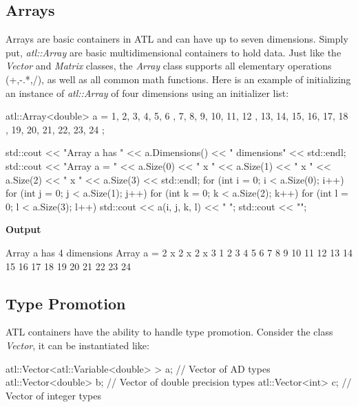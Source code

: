 \documentclass[12pt,a4paper]{article}
\begin{document}
\subsection{Arrays}
Arrays are basic containers in ATL and can have up to seven dimensions.   Simply put, \textit{atl::Array} are basic multidimensional containers to hold data. Just like the \textit{Vector} and \textit{Matrix} classes, the \textit{Array} class supports all elementary operations (+,-.*,/), as well as all common math functions. Here is an example of initializing an instance of \textit{atl::Array} of four dimensions using an initializer list:
\begin{cppsource}

  atl::Array<double> a = {
        {
            {
                {1, 2, 3},
                {4, 5, 6}
            },
            {
                {7, 8, 9},
                {10, 11, 12}
            }
        },
        {
            {
                {13, 14, 15},
                {16, 17, 18}
            },
            {
                {19, 20, 21},
                {22, 23, 24}
            }
        }
    };

    std::cout << "Array a has " << a.Dimensions() << " dimensions" << std::endl;
    std::cout << "Array a = " << a.Size(0) << " x " << a.Size(1) 
                  << " x " << a.Size(2) << " x " << a.Size(3) << std::endl;
    for (int i = 0; i < a.Size(0); i++) {
        for (int j = 0; j < a.Size(1); j++) {
            for (int k = 0; k < a.Size(2); k++) {
                for (int l = 0; l < a.Size(3); l++) {
                    std::cout << a(i, j, k, l) << " ";
                }
                std::cout << "\n";
            }
        }
    }
 \end{cppsource}   
 
 \textbf{Output} 
 
 \begin{myoutput}
 
Array a has 4 dimensions
Array a = 2 x 2 x 2 x 3
1 2 3 
4 5 6 
7 8 9 
10 11 12 
13 14 15 
16 17 18 
19 20 21 
22 23 24 
 

 \end{myoutput}
\subsection{Type Promotion}
ATL containers have the ability to handle type promotion. Consider the class \textit{Vector}, it can be instantiated like:
\begin{cppsource}
atl::Vector<atl::Variable<double> > a; // Vector of AD types
atl::Vector<double> b;                         // Vector of double precision types
atl::Vector<int> c;                                // Vector of integer types
\end{cppsource}
\end{document}

